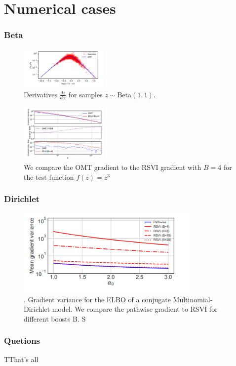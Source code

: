 \documentclass{beamer}
\begin{document}
\section{Numerical cases}
\begin{frame}
    \frametitle{Beta}
    \begin{figure}[h!]
      \centering
      \includegraphics[width=0.38\textwidth]{figures/beta_der.png}
      \caption{Derivatives $\frac{dz}{d\alpha}$ for samples $z \sim \text{Beta}(1, 1)$. }
      \label{fig:beta_der}
    \end{figure}
    \begin{figure}[h!]
      \centering
      \includegraphics[width=0.38\textwidth]{figures/beta_grad.png}
      \caption{We compare the OMT gradient to the RSVI gradient with
$B = 4$ for the test function $f(z) = z^3$}
      \label{fig:beta_der}
    \end{figure}
\end{frame}
\begin{frame}
    \frametitle{Dirichlet}
    \begin{figure}[h!]
      \centering
      \includegraphics[width=0.8\textwidth]{figures/dirichlet.png}
      \caption{. Gradient variance for the ELBO of a conjugate
Multinomial-Dirichlet model. We compare the pathwise gradient to RSVI for different boosts B. S}
      \label{fig:dirichlet}
    \end{figure}

\end{frame}


\begin{frame}
    \frametitle{Quetions}
    TThat's all
\end{frame}
\end{document}
